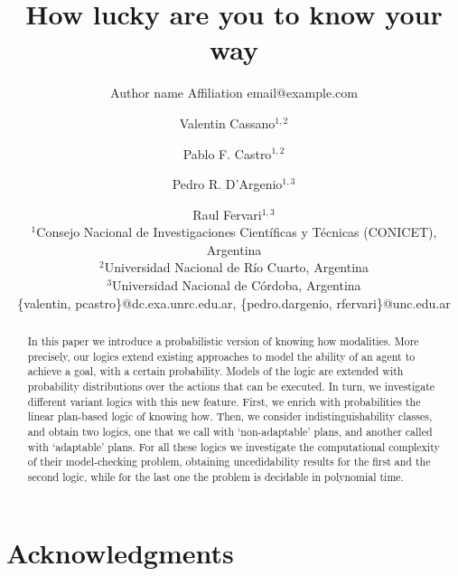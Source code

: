 \documentclass{article}
\title{How lucky are you to know your way}
\author{%
    Author name
    \affiliations
    Affiliation
    \emails
    email@example.com    %
}
\author{%
Valentin Cassano$^{1,2}$\and
Pablo F. Castro$^{1,2}$\and
Pedro R. D'Argenio$^{1,3}$\and
Raul Fervari$^{1,3}$ \\
\affiliations
$^1$Consejo Nacional de Investigaciones Cient\'ificas y T\'ecnicas (CONICET), Argentina\\
$^2$Universidad Nacional de R\'io Cuarto, Argentina\\
$^3$Universidad Nacional de C\'ordoba, Argentina\\
\emails
\{valentin, pcastro\}@dc.exa.unrc.edu.ar,
\{pedro.dargenio, rfervari\}@unc.edu.ar
}
\begin{document}
\maketitle

\begin{abstract}
  In this paper we introduce a probabilistic version of knowing how modalities. More precisely, our logics extend existing approaches to model the ability of an agent to achieve a goal, with a certain probability. Models of the logic are extended with probability distributions over the actions that can be executed. In turn, we investigate different variant logics with this new feature. First, we enrich with probabilities the linear plan-based logic of knowing how. Then, we consider indistinguishability classes, and obtain two logics, one that we call with `non-adaptable' plans, and another called with `adaptable' plans. For all these logics we investigate the computational complexity of their model-checking problem, obtaining uncedidability results for the first and the second logic, while for the last one the problem is decidable in polynomial time.
\end{abstract}






\section*{Acknowledgments}



\appendix






\end{document}
